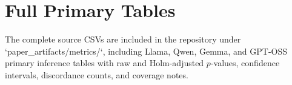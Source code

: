 \section{Full Primary Tables}



The complete source CSVs are included in the repository under `paper_artifacts/metrics/`, including Llama, Qwen, Gemma, and GPT-OSS primary inference tables with raw and Holm-adjusted $p$-values, confidence intervals, discordance counts, and coverage notes.